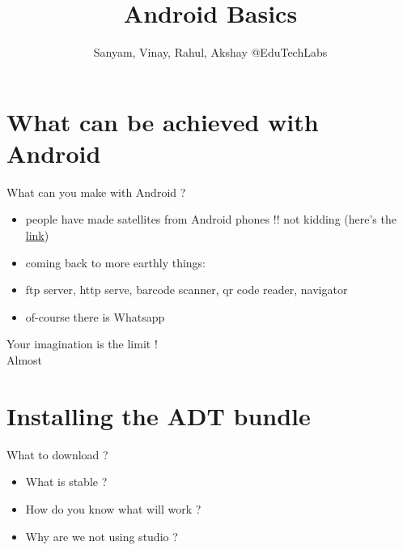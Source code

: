 \documentclass[11pt]{beamer}
\author{Sanyam, Vinay, Rahul, Akshay @EduTechLabs}
\title{Android Basics}
\begin{document}
\begin{frame}
\titlepage
\end{frame}


\section{What can be achieved with Android}

\begin{frame}[containsverbatim]{What can you make with Android ?}

	\begin{flushleft}
		\begin{itemize}			
		\item people have made satellites from Android phones !! not kidding (here's the \href{http://www.theverge.com/2013/5/3/4297718/nasa-phonesat-android-nexus-returns-images}{link})
		\item coming back to more earthly things:
		\item ftp server, http serve, barcode scanner, qr code reader, navigator 
		\item of-course there is Whatsapp
		\end{itemize}	
	\end{flushleft}

\huge Your imagination is the limit ! \\

\normalsize Almost 
\end{frame}


\section{Installing the ADT bundle}

\begin{frame}[containsverbatim]{What to download ?}
	\begin{flushleft}
	\begin{itemize}
	
		 \item What is stable ?
		 \item How do you know what will work ?
		 \item Why are we not using studio ?
	\end{itemize}	
	\end{flushleft}
\end{frame}
\end{document}
